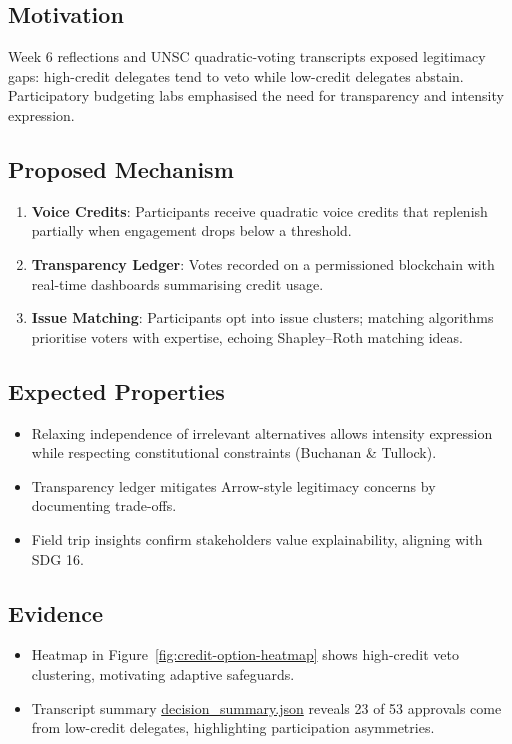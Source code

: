 \documentclass[11pt]{article}
\begin{document}
\subsection{Motivation}
Week 6 reflections and UNSC quadratic-voting transcripts exposed legitimacy gaps: high-credit delegates tend to veto while low-credit delegates abstain. Participatory budgeting labs emphasised the need for transparency and intensity expression.

\subsection{Proposed Mechanism}
\begin{enumerate}[leftmargin=*]
  \item \textbf{Voice Credits}: Participants receive quadratic voice credits that replenish partially when engagement drops below a threshold.
  \item \textbf{Transparency Ledger}: Votes recorded on a permissioned blockchain with real-time dashboards summarising credit usage.
  \item \textbf{Issue Matching}: Participants opt into issue clusters; matching algorithms prioritise voters with expertise, echoing Shapley--Roth matching ideas.
\end{enumerate}

\subsection{Expected Properties}
\begin{itemize}[leftmargin=*]
  \item Relaxing independence of irrelevant alternatives allows intensity expression while respecting constitutional constraints (Buchanan \& Tullock).
  \item Transparency ledger mitigates Arrow-style legitimacy concerns by documenting trade-offs.
  \item Field trip insights confirm stakeholders value explainability, aligning with SDG 16.
\end{itemize}

\subsection{Evidence}
\begin{itemize}[leftmargin=*]
  \item Heatmap in Figure~\ref{fig:credit-option-heatmap} shows high-credit veto clustering, motivating adaptive safeguards.
  \item Transcript summary \href{../visualizations/voting/decision_summary.json}{decision\_summary.json} reveals 23 of 53 approvals come from low-credit delegates, highlighting participation asymmetries.
\end{itemize}
\end{document}
